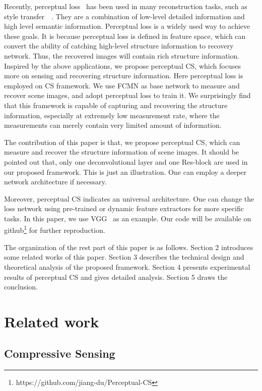 \documentclass[runningheads]{llncs}
\begin{document}
Recently, perceptual loss~\cite{Johnson2016Perceptual} has been used in many reconstruction tasks, such as style transfer~\cite{Johnson2016Perceptual}~\cite{Chen_2017_CVPR}.
They are a combination of low-level detailed information and high level semantic information. Perceptual loss is a widely used way to achieve these goals. It is because perceptual loss is defined in feature space, which can convert the ability of catching high-level structure information to recovery network. Thus, the recovered images will contain rich structure information. Inspired by the above applications, we propose perceptual CS, which focuses more on sensing and recovering structure information. Here perceptual loss is employed on CS framework. We use FCMN \cite{xie2017Fully} as base network to measure and recover scene images, and adopt perceptual loss to train it. We surprisingly find that this framework is capable of capturing and recovering the structure information, especially at extremely low measurement rate, where the measurements can merely contain very limited amount of information.

The contribution of this paper is that,
we propose perceptual CS, which can measure and recover the structure information of scene images.
It should be pointed out that, only one deconvolutional layer and one Res-block are used in our proposed framework. This is just an illustration.
One can employ a deeper network architecture if necessary.

Moreover, perceptual CS indicates an universal architecture. One can change the loss network using pre-trained or dynamic feature extractors for more specific tasks.
In this paper, we use VGG~\cite{Simonyan2014Very} as an example. Our code will be available on github\footnote{https://github.com/jiang-du/Perceptual-CS} for further reproduction.

The organization of the rest part of this paper is as follows. Section 2 introduces some related works of this paper. Section 3 describes the technical design and theoretical analysis of the proposed framework. Section 4 presents experimental results of perceptual CS and gives detailed analysis. Section 5 draws the conclusion.

\section{Related work}

\subsection{Compressive Sensing}
\end{document}
